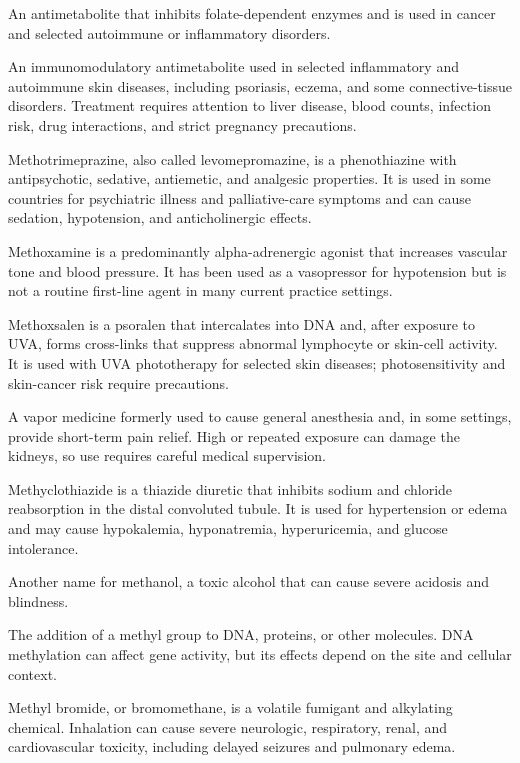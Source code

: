  An antimetabolite that inhibits folate-dependent enzymes and is used in cancer and selected autoimmune or inflammatory disorders.

 An immunomodulatory antimetabolite used in selected inflammatory and autoimmune skin
diseases, including psoriasis, eczema, and some connective-tissue disorders. Treatment
requires attention to liver disease, blood counts, infection risk, drug interactions,
and strict pregnancy precautions.

 Methotrimeprazine, also called levomepromazine, is a phenothiazine with antipsychotic, sedative, antiemetic, and analgesic properties. It is used in some countries for psychiatric illness and palliative-care symptoms and can cause sedation, hypotension, and anticholinergic effects.

 Methoxamine is a predominantly alpha-adrenergic agonist that increases vascular tone and blood pressure. It has been used as a vasopressor for hypotension but is not a routine first-line agent in many current practice settings.

 Methoxsalen is a psoralen that intercalates into DNA and, after exposure to UVA, forms cross-links that suppress abnormal lymphocyte or skin-cell activity. It is used with UVA phototherapy for selected skin diseases; photosensitivity and skin-cancer risk require precautions.

 A vapor medicine formerly used to cause general anesthesia and, in some settings, provide short-term pain relief. High or repeated exposure can damage the kidneys, so use requires careful medical supervision.

 Methyclothiazide is a thiazide diuretic that inhibits sodium and chloride reabsorption in the distal convoluted tubule. It is used for hypertension or edema and may cause hypokalemia, hyponatremia, hyperuricemia, and glucose intolerance.

 Another name for methanol, a toxic alcohol that can cause severe acidosis and blindness.

 The addition of a methyl group to DNA, proteins, or other molecules. DNA methylation can affect gene activity, but its effects depend on the site and cellular context.

 Methyl bromide, or bromomethane, is a volatile fumigant and alkylating chemical. Inhalation can cause severe neurologic, respiratory, renal, and cardiovascular toxicity, including delayed seizures and pulmonary edema.

